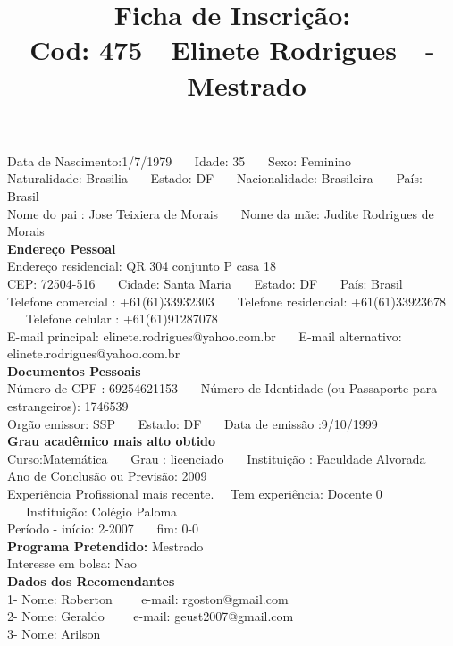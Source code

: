 \documentclass[11pt]{article}
\title{\vspace*{-4cm} Ficha de Inscrição: \\Cod: 475\ \ Elinete Rodrigues\ \ - \ \ Mestrado 
 }
\date{}
\begin{document}
\maketitle
\vspace*{-1.5cm}
\noindent Data de Nascimento:1/7/1979
\ \ \ Idade: 35   \ \ \ Sexo: Feminino
\\
Naturalidade: Brasilia  
\ \ \  Estado: DF
\ \ \  Nacionalidade: Brasileira
\ \ \ País: Brasil
\\        
Nome do pai : Jose Teixiera de Morais
\ \ \ Nome da mãe: Judite Rodrigues de Morais          
\\[0.2cm]                     
\textbf{Endereço Pessoal} 
\\ 
\noindent Endereço residencial: QR 304 conjunto P casa 18
\\
        CEP: 72504-516 
\ \ \ Cidade: Santa Maria 
\ \ \ Estado: DF 
\ \ \ País: Brasil
\\		
		Telefone comercial : +61(61)33932303
\ \ \ Telefone residencial: +61(61)33923678
\ \ \ Telefone celular : +61(61)91287078
\\
E-mail principal: elinete.rodrigues@yahoo.com.br
\ \ \ E-mail alternativo: elinete.rodrigues@yahoo.com.br 
\\[0.2cm] 
\textbf{Documentos Pessoais}
\\
\noindent Número de CPF : 69254621153
\ \ \ Número de Identidade (ou Passaporte para estrangeiros): 1746539
\\
Orgão emissor: SSP
\ \ \ Estado: DF
\ \ \ Data de emissão :9/10/1999
\\[0.3cm]
\textbf{Grau acadêmico mais alto obtido}
\\	
Curso:Matemática
\ \ \ Grau : licenciado
\ \ \ Instituição : Faculdade Alvorada
\\			
Ano de Conclusão ou Previsão: 2009
\\ 
Experiência Profissional mais recente. \ \  
Tem experiência: Docente 0  
\ \ \ Instituição: Colégio Paloma
\\  
Período - início: 2-2007
\ \ \ fim: 0-0
\\[0.2cm] 
\textbf{Programa Pretendido:} Mestrado\\
Interesse em bolsa: Nao
\\[0.3cm]		
\textbf{Dados dos Recomendantes} 
\\
1- Nome: Roberton
\ \ \ \  e-mail: rgoston@gmail.com 
\\
2- Nome: Geraldo
\ \ \ \ e-mail: geust2007@gmail.com
\\
3- Nome: Arilson
\end{document}

